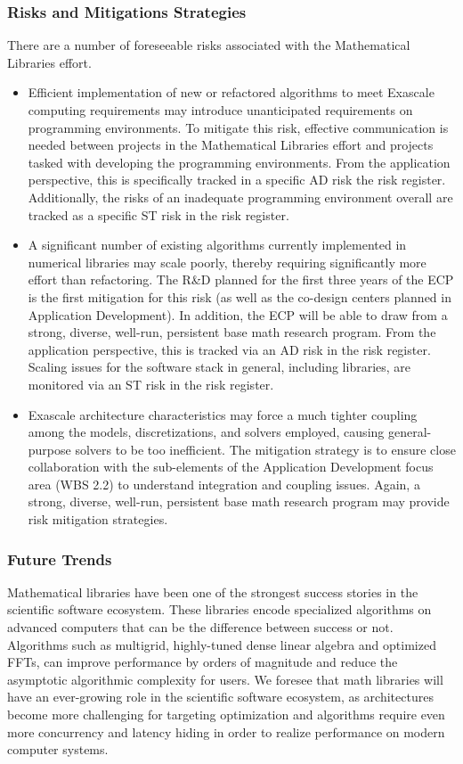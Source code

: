 \subsubsection{Risks and Mitigations Strategies}
There are a number of foreseeable risks associated with the Mathematical Libraries effort.
\begin{itemize}
	\item Efficient implementation of new or refactored algorithms to meet Exascale computing requirements may introduce unanticipated requirements on programming environments. To mitigate this risk, effective communication is needed between projects in the Mathematical Libraries effort and projects tasked with developing the programming environments. From the application perspective, this is specifically tracked in a specific AD risk the risk register. Additionally, the risks of an inadequate programming environment overall are tracked as a specific ST risk in the risk register.
	\item A significant number of existing algorithms currently implemented in numerical libraries may scale poorly, thereby requiring significantly more effort than refactoring. The R\&D planned for the first three years of the ECP is the first mitigation for this risk (as well as the co-design centers planned in Application Development). In addition, the ECP will be able to draw from a strong, diverse, well-run, persistent base math research program. From the application perspective, this is tracked via an AD risk in the risk register. Scaling issues for the software stack in general, including libraries, are monitored via an ST risk in the risk register.
	\item Exascale architecture characteristics may force a much tighter coupling among the models, discretizations, and solvers employed, causing general-purpose solvers to be too inefficient. The mitigation strategy is to ensure close collaboration with the sub-elements of the Application Development focus area (WBS 2.2) to understand integration and coupling issues. Again, a strong, diverse, well-run, persistent base math research program may provide risk mitigation strategies.
\end{itemize}

\subsubsection{Future Trends}
Mathematical libraries have been one of the strongest success stories in the scientific software ecosystem.  These libraries encode specialized algorithms on advanced computers that can be the difference between success or not.  Algorithms such as multigrid, highly-tuned dense linear algebra and optimized FFTs, can improve performance by orders of magnitude and reduce the asymptotic algorithmic complexity for users.  We foresee that math libraries will have an ever-growing role in the scientific software ecosystem, as architectures become more challenging for targeting optimization and algorithms require even more concurrency and latency hiding in order to realize performance on modern computer systems.

